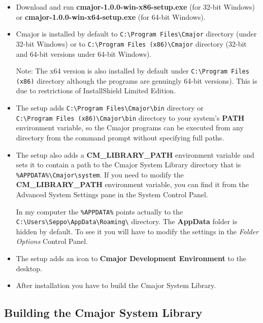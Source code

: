 \documentclass[oneside, a4paper, 11pt]{article}
\begin{document}
\begin{itemize}

\item
Download and run \textbf{cmajor-1.0.0-win-x86-setup.exe} (for 32-bit Windows) or
\textbf{cmajor-1.0.0-win-x64-setup.exe} (for 64-bit Windows).

\item
Cmajor is installed by default to \verb|C:\Program Files\Cmajor| directory (under 32-bit Windows) or
to \verb|C:\Program Files (x86)\Cmajor| directory (32-bit and 64-bit versions under 64-bit Windows).

Note: The x64 version is also installed by default under
\verb|C:\Program Files (x86)| directory although the programs are genuingly 64-bit versions).
This is due to restrictions of InstallShield Limited Edition.

\item
The setup adds \verb|C:\Program Files\Cmajor\bin| directory or \\
\verb|C:\Program Files (x86)\Cmajor\bin| directory
to your system's \textbf{PATH} environment variable, so the Cmajor programs can be executed from any
directory from the command prompt without specifying full paths.

\item
The setup also adds a \textbf{CM\_LIBRARY\_PATH} environment variable and
sets it to contain a path to the Cmajor System Library directory
that is \verb|%APPDATA%\Cmajor\system|. If you need to modify the
\textbf{CM\_LIBRARY\_PATH} environment variable, you can find it from the Advanced System Settings pane in the System Control Panel.

In my computer the \verb|%APPDATA%| points actually to the
\verb|C:\Users\Seppo\AppData\Roaming\| directory. The \textbf{AppData} folder
is hidden by default. To see it you will have to modify the settings in
the \emph{Folder Options} Control Panel.

\item
The setup adds an icon to \textbf{Cmajor Development Environment} to the desktop.

\item
After installation you have to build the Cmajor System Library.


\end{itemize}

\subsection{Building the Cmajor System Library}
\end{document}
